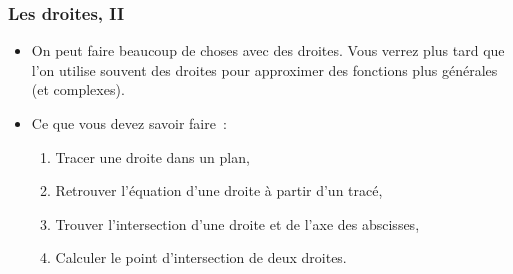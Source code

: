 \documentclass[10pt,notheorems]{beamer}
\theoremstyle{plain}
\theoremstyle{definition} %
\begin{document}
\begin{frame}
  \frametitle{Les droites, II}
  \hypertarget{slide_droites_2}{}

  \bigskip

  \begin{itemize}

  \item On peut faire beaucoup de choses avec des droites. Vous verrez plus tard que l'on utilise souvent des droites pour approximer des fonctions plus générales (et complexes).\newline

  \item Ce que vous devez savoir faire~:\newline

    \begin{enumerate}

    \item Tracer une droite dans un plan,\newline

    \item Retrouver l'équation d'une droite à partir d'un tracé,\newline

    \item Trouver l'intersection d'une droite et de l'axe des abscisses,\newline

    \item Calculer le point d'intersection de deux droites.\newline

    \end{enumerate}

  \end{itemize}

\end{frame}
\end{document}
